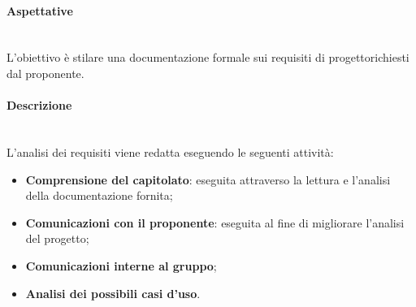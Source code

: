 \paragraph*{Aspettative}\mbox{}\\ [1mm]
L'obiettivo è stilare una documentazione formale sui requisiti di progetto\glosp richiesti dal proponente.
\paragraph*{Descrizione}\mbox{}\\ [1mm]
L'analisi dei requisiti viene redatta eseguendo le seguenti attività:
\begin{itemize}
	\item \textbf{Comprensione del capitolato}\glo: eseguita attraverso la lettura e l'analisi della documentazione fornita;
	\item \textbf{Comunicazioni con il proponente}: eseguita al fine di migliorare l'analisi del progetto\glo;
	\item \textbf{Comunicazioni interne al gruppo};
	\item \textbf{Analisi dei possibili casi d'uso\glo}.
\end{itemize}
